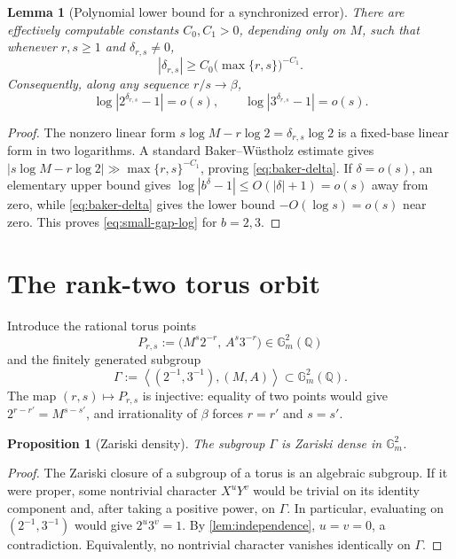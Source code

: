 \documentclass[11pt,oneside]{article}
\newtheorem{proposition}[theorem]{Proposition}
\newtheorem{lemma}[theorem]{Lemma}
\theoremstyle{definition}
\newcommand{\Q}{\mathbb{Q}}
\newcommand{\Gm}{\mathbb{G}_{m}}
\newcommand{\ang}[1]{\left\langle #1\right\rangle}
\newcommand{\abs}[1]{\left|#1\right|}
\begin{document}
\begin{lemma}[Polynomial lower bound for a synchronized error]
\label{lem:baker-delta}
There are effectively computable constants $C_0,C_1>0$, depending only on
$M$, such that whenever $r,s\ge1$ and $\delta_{r,s}\ne0$,
\begin{equation}\label{eq:baker-delta}
  \abs{\delta_{r,s}}
  \ge C_0\bigl(\max\{r,s\}\bigr)^{-C_1}.
\end{equation}
Consequently, along any sequence $r/s\to\beta$,
\begin{equation}\label{eq:small-gap-log}
  \log\abs{2^{\delta_{r,s}}-1}=o(s),
  \qquad
  \log\abs{3^{\delta_{r,s}}-1}=o(s).
\end{equation}
\end{lemma}

\begin{proof}
The nonzero linear form
$s\log M-r\log2=\delta_{r,s}\log2$ is a fixed-base linear form in two
logarithms.  A standard Baker--W\"ustholz estimate gives
$\abs{s\log M-r\log2}\gg\max\{r,s\}^{-C_1}$, proving
\eqref{eq:baker-delta}.  If $\delta=o(s)$, an elementary upper bound gives
$\log\abs{b^\delta-1\!}\le O(\abs\delta+1)=o(s)$ away from zero, while
\eqref{eq:baker-delta} gives the lower bound $-O(\log s)=o(s)$ near zero.
This proves \eqref{eq:small-gap-log} for $b=2,3$.
\end{proof}

\section{The rank-two torus orbit}\label{sec:torus-orbit}

Introduce the rational torus points
\begin{equation}\label{eq:orbit-point}
  P_{r,s}:=\bigl(M^s2^{-r},\,A^s3^{-r}\bigr)
  \in\Gm^2(\Q)
\end{equation}
and the finitely generated subgroup
\begin{equation}\label{eq:Gamma}
  \Gamma:=\ang{(2^{-1},3^{-1}),(M,A)}
  \subset\Gm^2(\Q).
\end{equation}
The map $(r,s)\mapsto P_{r,s}$ is injective: equality of two points would
give $2^{r-r'}=M^{s-s'}$, and irrationality of $\beta$ forces
$r=r'$ and $s=s'$.

\begin{proposition}[Zariski density]\label{prop:zariski-dense}
The subgroup $\Gamma$ is Zariski dense in $\Gm^2$.
\end{proposition}

\begin{proof}
The Zariski closure of a subgroup of a torus is an algebraic subgroup.  If
it were proper, some nontrivial character $X^uY^v$ would be trivial on its
identity component and, after taking a positive power, on $\Gamma$.  In
particular, evaluating on $(2^{-1},3^{-1})$ would give
$2^u3^v=1$.  By \cref{lem:independence}, $u=v=0$, a contradiction.
Equivalently, no nontrivial character vanishes identically on $\Gamma$.
\end{proof}
\end{document}
